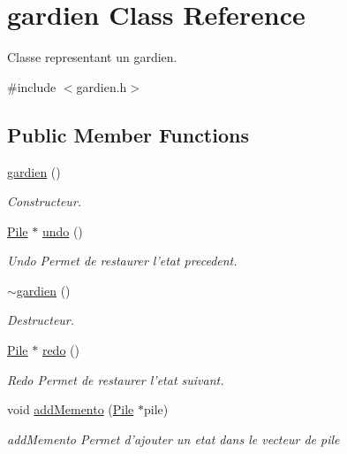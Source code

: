 \hypertarget{classgardien}{\section{gardien Class Reference}
\label{classgardien}
}


Classe representant un gardien.  




{\ttfamily \#include $<$gardien.\-h$>$}

\subsection*{Public Member Functions}
\begin{DoxyCompactItemize}
\item 
\hyperlink{classgardien_a23b498d98e7a90384585f9d3721b29fe}{gardien} ()
\begin{DoxyCompactList}\small\item\em Constructeur. \end{DoxyCompactList}\item 
\hyperlink{class_pile}{Pile} $\ast$ \hyperlink{classgardien_a766daaa5df48bed986a03f188c8de4e0}{undo} ()
\begin{DoxyCompactList}\small\item\em Undo Permet de restaurer l'etat precedent. \end{DoxyCompactList}\item 
\hypertarget{classgardien_a87e46d75ffcaa3f126d2eac2f283195e}{\hyperlink{classgardien_a87e46d75ffcaa3f126d2eac2f283195e}{$\sim$gardien} ()}\label{classgardien_a87e46d75ffcaa3f126d2eac2f283195e}

\begin{DoxyCompactList}\small\item\em Destructeur. \end{DoxyCompactList}\item 
\hyperlink{class_pile}{Pile} $\ast$ \hyperlink{classgardien_a2c4455417103371b0281a01e32ac77fc}{redo} ()
\begin{DoxyCompactList}\small\item\em Redo Permet de restaurer l'etat suivant. \end{DoxyCompactList}\item 
void \hyperlink{classgardien_a57921f6a2f454c4cd793d2a702af5d0a}{add\-Memento} (\hyperlink{class_pile}{Pile} $\ast$pile)
\begin{DoxyCompactList}\small\item\em add\-Memento Permet d'ajouter un etat dans le vecteur de pile \end{DoxyCompactList}\end{DoxyCompactItemize}


